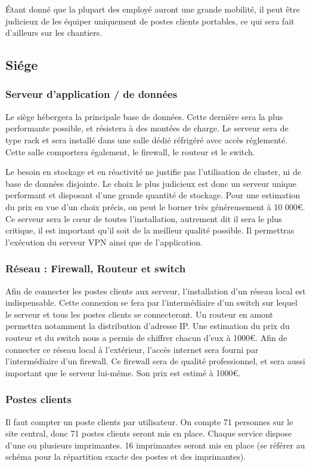     Étant donné que la plupart des employé auront une grande mobilité, il peut être judicieux de les équiper uniquement de postes clients portables, ce qui sera fait d'ailleurs sur les chantiers.

    \subsection{Siége}

        \subsubsection{Serveur d'application / de données}
            Le siège hébergera la principale base de données. Cette dernière sera la plus performante possible, et résistera à des montées de charge. Le serveur sera de type rack et sera installé dans une salle dédié réfrigéré avec accès réglementé. Cette salle comportera également, le firewall, le routeur et le switch.

            Le besoin en stockage et en réactivité ne justifie pas l'utilisation de cluster, ni de base de données disjointe. Le choix le plus judicieux est donc un serveur unique performant et disposant d'une grande quantité de stockage. Pour une estimation du prix en vue d'un choix précis, on peut le borner très généreusement à 10 000€.
            Ce serveur sera le cœur de toutes l'installation, autrement dit il sera le plus critique, il est important qu'il soit de la meilleur qualité possible. Il permettras l'exécution du serveur VPN ainsi que de l'application.

        \subsubsection{Réseau : Firewall, Routeur et switch}
            Afin de connecter les postes clients aux serveur, l'installation d'un réseau local est indispensable. Cette connexion se fera par l'intermédiaire d'un switch sur lequel le serveur et tous les postes clients se connecteront. Un routeur en amont permettra notamment la distribution d'adresse IP. Une estimation du prix du routeur et du switch nous a permis de chiffrer chacun d'eux à 1000€.
            Afin de connecter ce réseau local à l'extérieur, l'accès internet sera fourni par l'intermédiaire d'un firewall. Ce firewall sera de qualité professionnel, et sera aussi important que le serveur lui-même. Son prix est estimé à 1000€.
        
        \subsubsection{Postes clients}
            Il faut compter un poste clients par utilisateur. On compte 71 personnes sur le site central, donc 71 postes clients seront mis en place. Chaque service dispose d'une ou plusieurs imprimantes. 16 imprimantes seront mis en place (se référer au schéma pour la répartition exacte des postes et des imprimantes).

